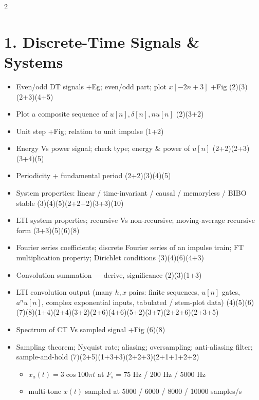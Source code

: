 \documentclass[10pt]{article}
\begin{document}
\begin{multicols}{2}
\footnotesize

\section*{1. Discrete-Time Signals \& Systems}
\begin{itemize}
  \item Even/odd DT signals +Eg; even/odd part; plot $x[-2n+3]$ +Fig \hfill (2)\allowbreak(3)\allowbreak(2+3)\allowbreak(4+5)
  \item Plot a composite sequence of $u[n],\delta[n],nu[n]$ \hfill (2)\allowbreak(3+2)
  \item Unit step +Fig; relation to unit impulse \hfill (1+2)
  \item Energy Vs power signal; check type; energy \& power of $u[n]$ \hfill (2+2)\allowbreak(2+3)\allowbreak(3+4)\allowbreak(5)
  \item Periodicity + fundamental period \hfill (2+2)\allowbreak(3)\allowbreak(4)\allowbreak(5)
  \item System properties: linear / time-invariant / causal / memoryless / BIBO stable \hfill (3)\allowbreak(4)\allowbreak(5)\allowbreak(2+2+2)\allowbreak(3+3)\allowbreak(10)
  \item LTI system properties; recursive Vs non-recursive; moving-average recursive form \hfill (3+3)\allowbreak(5)\allowbreak(6)\allowbreak(8)
  \item Fourier series coefficients; discrete Fourier series of an impulse train; FT multiplication property; Dirichlet conditions \hfill (3)\allowbreak(4)\allowbreak(6)\allowbreak(4+3)
  \item Convolution summation --- derive, significance \hfill (2)\allowbreak(3)\allowbreak(1+3)
  \item LTI convolution output (many $h,x$ pairs: finite sequences, $u[n]$ gates, $a^n u[n]$, complex exponential inputs, tabulated / stem-plot data) \hfill (4)\allowbreak(5)\allowbreak(6)\allowbreak(7)\allowbreak(8)\allowbreak(1+4)\allowbreak(2+4)\allowbreak(3+2)\allowbreak(2+6)\allowbreak(4+6)\allowbreak(5+2)\allowbreak(3+7)\allowbreak(2+2+6)\allowbreak(2+3+5)
  \item Spectrum of CT Vs sampled signal +Fig \hfill (6)\allowbreak(8)
  \item Sampling theorem; Nyquist rate; aliasing; oversampling; anti-aliasing filter; sample-and-hold \hfill (7)\allowbreak(2+5)\allowbreak(1+3+3)\allowbreak(2+2+3)\allowbreak(2+1+1+2+2)
    \begin{itemize}
      \item $x_a(t)=3\cos100\pi t$ at $F_s=75$ Hz / 200 Hz / 5000 Hz
      \item multi-tone $x(t)$ sampled at 5000 / 6000 / 8000 / 10000 samples/s
    \end{itemize}
\end{itemize}


\end{multicols}
\end{document}

